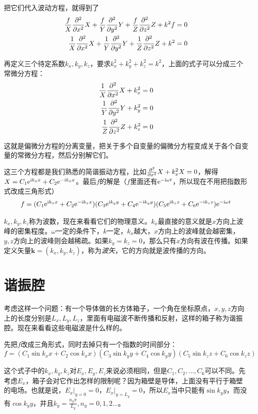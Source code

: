 把它们代入波动方程，就得到了
\begin{align*}
\frac{f}{X} \frac{\partial^{2}}{\partial x^{2}} X+\frac{f}{Y} \frac{\partial^{2}}{\partial y^{2}} Y+\frac{f}{Z} \frac{\partial^{2}}{\partial z^{2}} Z+k^2 f&=0 \\
\frac{1}{X} \frac{\partial^{2}}{\partial x^{2}} X+\frac{1}{Y} \frac{\partial^{2}}{\partial y^{2}} Y+\frac{1}{Z} \frac{\partial^{2}}{\partial z^{2}} Z+k^2&=0
\end{align*}

再定义三个待定系数$k_x,k_y,k_z$，要求$k_x^2+k_y^2+k_z^2=k^2$，上面的式子可以分成三个常微分方程：
\begin{align*}
\frac{1}{X} \frac{\partial^{2}}{\partial x^{2}} X+k_x^2&=0 \\
\frac{1}{Y} \frac{\partial^{2}}{\partial y^{2}} Y+k_y^2&=0 \\
\frac{1}{Z} \frac{\partial^{2}}{\partial z^{2}} Z+k_z^2&=0
\end{align*}

这就是偏微分方程的分离变量，把关于多个自变量的偏微分方程变成关于各个自变量的常微分方程，然后分别解它们。

这三个方程都是我们熟悉的简谐振动方程，比如$\frac{\partial^{2}}{\partial x^{2}} X+k_x^2 X=0$，解得$X=C_1 \mathrm{e}^{\mathrm{i} k_x x}+C_2 \mathrm{e}^{-\mathrm{i} k_x x}$。最后$f$的解是（$f$里面还有$\mathrm{e}^{-\mathrm{i} \omega t}$，所以现在不用把指数形式改成三角形式）
\begin{equation*}
f=(C_1 \mathrm{e}^{\mathrm{i} k_x x}+C_2 \mathrm{e}^{-\mathrm{i} k_x x})(C_3 \mathrm{e}^{\mathrm{i} k_y y}+C_4 \mathrm{e}^{-\mathrm{i} k_y y})(C_5 \mathrm{e}^{\mathrm{i} k_z z}+C_6 \mathrm{e}^{-\mathrm{i} k_z z}) \mathrm{e}^{-\mathrm{i} \omega t}
\end{equation*}

$k_x,k_y,k_z$称为波数，现在来看看它们的物理意义。$k_x$最直接的意义就是$x$方向上波峰的密集程度。$\omega$一定的条件下，$k$一定，$k_x$越大，$x$方向上的波峰就会越密集，$y,z$方向上的波峰则会越稀疏。如果$k_y=k_z=0$，那么只有$x$方向有波在传播。如果定义矢量$\mathbf{k}=(k_x,k_y,k_z)$，称为\emph{波矢}，它的方向就是波传播的方向。
\section{谐振腔}
考虑这样一个问题：有一个导体做的长方体箱子，一个角在坐标原点，$x,y,z$方向上的长度分别是$L_x,L_y,L_z$，里面有电磁波不断传播和反射，这样的箱子称为谐振腔。现在来看看这些电磁波是什么样的。

先把$f$改成三角形式，同时去掉只有一个指数的时间部分：
\begin{equation*}
f=(C_1 \sin k_x x+C_2 \cos k_x x)(C_3 \sin k_y y+C_4 \cos k_y y)(C_5 \sin k_z z+C_6 \cos k_z z)
\end{equation*}

这个式子中的$k_x,k_y,k_z$对$E_x,E_y,E_z$来说必须相同，但是$C_1,C_2,\dots,C_6$可以不同。先考虑$E_x$，箱子会对它作出怎样的限制呢？因为箱壁是导体，上面没有平行于箱壁的电场。也就是说，$E_x|_{y=0}=0$，$E_x|_{y=L_y}=0$，所以$E_x$当中只能有$\sin k_y y$，而没有$\cos k_y y$，并且$k_y=\frac{n_y \pi}{L_y}, n_y=0,1,2 \dots$。

